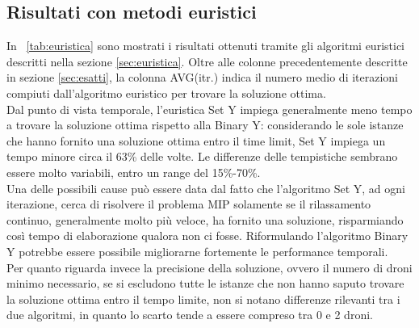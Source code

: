 \subsection{Risultati con metodi euristici}
In \tablename\ \ref{tab:euristica} sono mostrati i risultati ottenuti tramite gli algoritmi euristici descritti nella sezione \ref{sec:euristica}. Oltre alle colonne precedentemente descritte in sezione \ref{sec:esatti}, la colonna AVG(itr.) indica il numero medio di iterazioni compiuti dall'algoritmo euristico per trovare la soluzione ottima. \\
Dal punto di vista temporale, l'euristica Set Y impiega generalmente meno tempo a trovare la soluzione ottima rispetto alla Binary Y: considerando le sole istanze che hanno fornito una soluzione ottima entro il time limit, Set Y impiega un tempo minore circa il 63\% delle volte. 
Le differenze delle tempistiche sembrano essere molto variabili, entro un range del 15\%-70\%. \\
Una delle possibili cause può essere data dal fatto che l'algoritmo Set Y, ad ogni iterazione, cerca di risolvere il problema MIP solamente se il rilassamento continuo, generalmente molto più veloce, ha fornito una soluzione, risparmiando così tempo di elaborazione qualora non ci fosse. Riformulando l'algoritmo Binary Y potrebbe essere possibile migliorarne fortemente le performance temporali.   \\
Per quanto riguarda invece la precisione della soluzione, ovvero il numero di droni minimo necessario, se si escludono tutte le istanze che non hanno saputo trovare la soluzione ottima entro il tempo limite, non si notano differenze rilevanti tra i due algoritmi, in quanto lo scarto tende a essere compreso tra 0 e 2 droni. 
%
